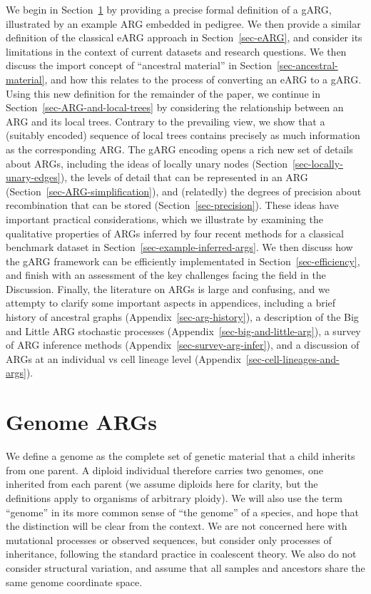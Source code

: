 \documentclass{article}
\begin{document}
We begin in Section~\ref{sec-gARG} by providing a precise formal definition
of a gARG, illustrated by an example ARG embedded in pedigree.
We then provide a similar definition of the classical eARG
approach in Section~\ref{sec-eARG}, and consider its limitations
in the context of current datasets and research questions.
We then discuss the import concept of ``ancestral material''
in Section~\ref{sec-ancestral-material}, and how this relates
to the process of converting an eARG to a gARG.
Using this new definition for the remainder of the paper,
we continue
in Section~\ref{sec-ARG-and-local-trees} by considering the relationship
between an ARG and its local trees. Contrary to the
prevailing view, we show that a (suitably encoded) sequence of local trees contains
precisely as much information as the corresponding ARG.
The gARG encoding opens a rich new set of details about ARGs,
including the ideas of locally unary nodes
(Section~\ref{sec-locally-unary-edges}),
the levels of detail that can be represented in an ARG
(Section~\ref{sec-ARG-simplification}),
and (relatedly) the degrees of precision about recombination
that can be stored (Section~\ref{sec-precision}).
These ideas have important practical considerations,
which we illustrate by examining the qualitative properties of
ARGs inferred by four recent methods for a classical benchmark
dataset in Section~\ref{sec-example-inferred-args}.
We then discuss how the gARG framework can be
efficiently implementated in Section~\ref{sec-efficiency},
and finish with an assessment of the key challenges facing
the field in the Discussion.
Finally, the literature on ARGs is large and
confusing, and we attempty to clarify some important aspects
in appendices, including
a brief history of ancestral graphs (Appendix~\ref{sec-arg-history}),
a description of the Big and Little ARG stochastic processes
 (Appendix~\ref{sec-big-and-little-arg}),
a survey of ARG inference methods (Appendix~\ref{sec-survey-arg-infer}),
and a discussion of ARGs at an individual vs cell
lineage level (Appendix~\ref{sec-cell-lineages-and-args}).

\section{Genome ARGs}
\label{sec-gARG}
We define a genome as the complete set of genetic material that a child
inherits from one parent. A diploid individual  
therefore carries two genomes, one inherited from each parent (we assume diploids here
for clarity, but the definitions apply to organisms of arbitrary ploidy).
We will also use the term ``genome'' in its
more common sense of ``the genome'' of a species,
and hope that the distinction will be clear from the context.
We are not concerned here with mutational processes or observed sequences,
but consider only processes of inheritance,
following the standard practice in coalescent theory.
We also do not consider structural variation, and assume that all
samples and ancestors share the same genome coordinate space.
\end{document}
